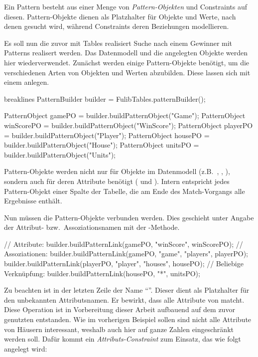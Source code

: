 Ein Pattern besteht aus einer Menge von \emph{Pattern-Objekten} und Constraints auf diesen.
Pattern-Objekte dienen als Platzhalter für Objekte und Werte, nach denen gesucht wird,
während Constraints deren Beziehungen modellieren.

Es soll nun die zuvor mit Tables realisiert Suche nach einem Gewinner mit Patterns realisert werden.
Das Datenmodell und die angelegten Objekte werden hier wiederverwendet.
Zunächst werden einige Pattern-Objekte benötigt, um die verschiedenen Arten von Objekten und Werten abzubilden.
Diese lassen sich mit einem  anlegen.

\begin{jcodeblock*}{breaklines}
    PatternBuilder builder = FulibTables.patternBuilder();

    PatternObject gamePO = builder.buildPatternObject("Game");
    PatternObject winScorePO = builder.buildPatternObject("WinScore");
    PatternObject playerPO = builder.buildPatternObject("Player");
    PatternObject housePO = builder.buildPatternObject("House");
    PatternObject unitsPO = builder.buildPatternObject("Units");
\end{jcodeblock*}

Pattern-Objekte werden nicht nur für Objekte im Datenmodell (z.B.\ , , ),
sondern auch für deren Attribute benötigt ( und ).
Intern entspricht jedes Pattern-Objekt einer Spalte der Tabelle, die am Ende des Match-Vorgangs alle Ergebnisse enthält.

Nun müssen die Pattern-Objekte verbunden werden.
Dies geschieht unter Angabe der Attribut- bzw.\ Assoziationsnamen mit der -Methode.

\begin{jcodeblock}
    // Attribute:
    builder.buildPatternLink(gamePO, "winScore", winScorePO);
    // Assoziationen:
    builder.buildPatternLink(gamePO, "game", "players", playerPO);
    builder.buildPatternLink(playerPO, "player", "houses", housePO);
    // Beliebige Verknüpfung:
    builder.buildPatternLink(housePO, "*", unitsPO);
\end{jcodeblock}

Zu beachten ist in der letzten Zeile der Name ``\code{*}''.
Dieser dient als Platzhalter für den unbekannten Attributsnamen.
Er bewirkt, dass  alle Attribute von  matcht.
Diese Operation ist in Vorbereitung dieser Arbeit aufbauend auf dem zuvor genutzten  entstanden.
Wie im vorherigen Beispiel sollen sind nicht alle Attribute von Häusern interessant,
weshalb auch hier auf ganze Zahlen eingeschränkt werden soll.
Dafür kommt ein \emph{Attributs-Constraint} zum Einsatz, das wie folgt angelegt wird:

